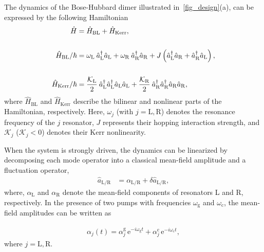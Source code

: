\documentclass[%
reprint,
floatfix,
superscriptaddress,
amsmath,amssymb,
aps,
pra,
]{revtex4-2}
\newcommand*{\scrpt}[1]{\mathrm{#1}}
\newcommand*{\s}[1]{\ensuremath{_\scrpt{#1}}}
\begin{document}
The dynamics of the Bose-Hubbard dimer illustrated in~\cref{fig_design}(a), can be expressed by the following Hamiltonian
%
\begin{subequations}
\begin{align}
    \label{H123}
    \hat H  & =  \hat H\s{BL} + \hat H\s{Kerr},
    \\
    \text{\vspace{1.5em}} \nonumber \\
    \hat H\s{BL} / \hbar & = \omega\s{L} \: \hat a\s{L}^{\dagger} \hat a\s{L} + \omega\s{R} \: \hat a\s{R}^{\dagger} \hat a\s{R} + J \left(\hat a\s{L}^{\dagger} \hat a\s{R} + \hat a\s{R}^{\dagger} \hat a\s{L} \right),
    \\
    \text{\vspace{1.5em}} \nonumber \\
    \hat H\s{Kerr} / \hbar  & =  \frac{\mathcal{K}\s{L}}{2} \: \hat a\s{L}^{\dagger} \hat a\s{L}^{\dagger} \hat a\s{L} \hat a\s{L} + \frac{\mathcal{K}\s{R}}{2} \: \hat a\s{R}^{\dagger} \hat a\s{R}^{\dagger} \hat a\s{R} \hat a\s{R},
\end{align}
\end{subequations}
%
where $\hat H\s{BL}$ and $\hat H\s{Kerr}$ describe the bilinear and nonlinear parts of the Hamiltonian, respectively. Here, $\omega_j$ (with $j = \mathrm{L} , \mathrm{R}$) denotes the resonance frequency of the $j$ resonator, $J$ represents their hopping interaction strength, and $\mathcal{K}_j$ ($\mathcal{K}_j<0$) denotes their Kerr nonlinearity. 

When the system is strongly driven, the dynamics can be linearized by decomposing each mode operator into a classical mean-field amplitude and a fluctuation operator,
%
\begin{align}
\label{Mean_Bare}
\hat{a}\s{L/R} & = \alpha\s{L/R}  +  \delta  \hat a\s{L/R}, 
\end{align}
%
where, $\alpha\s{L}$ and $\alpha\s{R}$ denote the mean-field components of resonators L and R, respectively. In the presence of two pumps with frequencies $\omega\s{g}$ and $\omega\s{c}$, the mean-field amplitudes can be written as 

\begin{align}
\label{Ansatz_two}
\alpha_j (t) = \alpha\mathrm{^g_\textit{j}} \, \mathrm{e}^{- i \omega\mathrm{_g} t} + \alpha\mathrm{^c_\textit{j}} \, \mathrm{e}^{- i \omega\mathrm{_c} t},
\end{align}
%
where $j = \mathrm{L, R}$.
\end{document}
